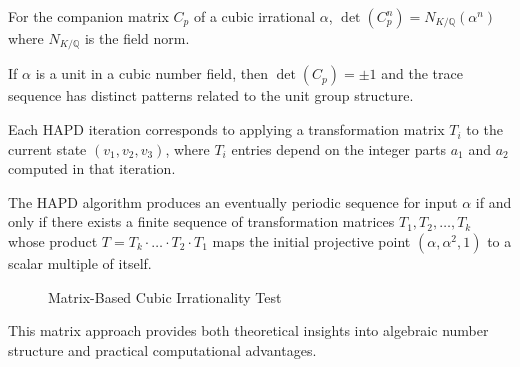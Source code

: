 \begin{theorem}
For the companion matrix $C_p$ of a cubic irrational $\alpha$, $\det(C_p^n) = N_{K/\mathbb{Q}}(\alpha^n)$ where $N_{K/\mathbb{Q}}$ is the field norm.
\end{theorem}

\begin{proposition}
If $\alpha$ is a unit in a cubic number field, then $\det(C_p) = \pm 1$ and the trace sequence has distinct patterns related to the unit group structure.
\end{proposition}

\begin{proposition}\label{prop:matrix_hapd}
Each HAPD iteration corresponds to applying a transformation matrix $T_i$ to the current state $(v_1, v_2, v_3)$, where $T_i$ entries depend on the integer parts $a_1$ and $a_2$ computed in that iteration.
\end{proposition}

\begin{theorem}\label{thm:matrix_periodicity}
The HAPD algorithm produces an eventually periodic sequence for input $\alpha$ if and only if there exists a finite sequence of transformation matrices $T_1, T_2, \ldots, T_k$ whose product $T = T_k \cdot \ldots \cdot T_2 \cdot T_1$ maps the initial projective point $(\alpha, \alpha^2, 1)$ to a scalar multiple of itself.
\end{theorem}

\begin{figure}[htbp]
\centering
{}
\caption{Matrix-Based Cubic Irrationality Test}
\label{alg:matrix_cubic}
\end{figure}

This matrix approach provides both theoretical insights into algebraic number structure and practical computational advantages.

